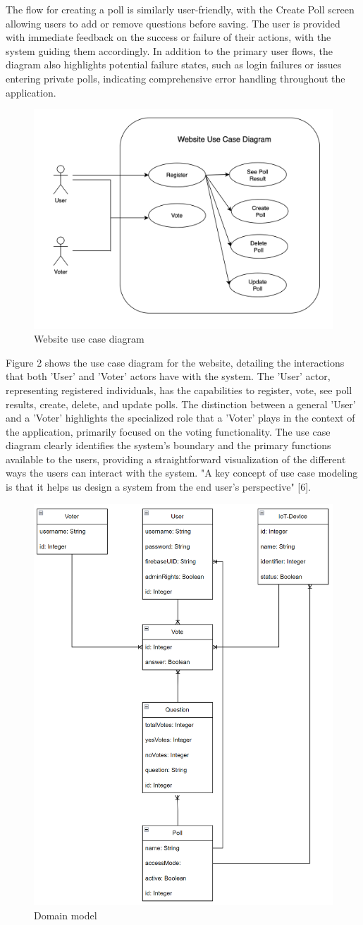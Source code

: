 The flow for creating a poll is similarly user-friendly, with the Create Poll screen allowing users to add or remove questions before saving. The user is provided with immediate feedback on the success or failure of their actions, with the system guiding them accordingly. In addition to the primary user flows, the diagram also highlights potential failure states, such as login failures or issues entering private polls, indicating comprehensive error handling throughout the application.
    


\begin{figure}[!htbp]
\centering
\includegraphics[width=0.5\linewidth]{figs/UserDiagram.png}
\caption{Website use case diagram}
\label{fig:userdiagram}
\end{figure}

Figure 2 shows the use case diagram for the website, detailing the interactions that both 'User' and 'Voter' actors have with the system. The 'User' actor, representing registered individuals, has the capabilities to register, vote, see poll results, create, delete, and update polls. The distinction between a general 'User' and a 'Voter' highlights the specialized role that a 'Voter' plays in the context of the application, primarily focused on the voting functionality. The use case diagram clearly identifies the system's boundary and the primary functions available to the users, providing a straightforward visualization of the different ways the users can interact with the system. "A key concept of use case modeling is that it helps us design a system from the end user's perspective" [6].


\begin{figure}[!htbp]
\centering
\includegraphics[width=0.4\linewidth]{figs/DomainModel.png}
\caption{Domain model}
\label{fig:domainmodel}
\end{figure}

